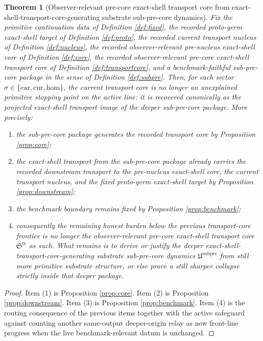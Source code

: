 \documentclass[11pt]{article}
\newcommand{\Car}{\mathrm{car}}
\newcommand{\Cur}{\mathrm{cur}}
\newcommand{\Hom}{\mathrm{hom}}
\newcommand{\PreCoreTransportCore}{\mathfrak S^{\mathrm{tr}}}
\newcommand{\SubPreCorePackage}{\mathfrak U^{\mathrm{subpre}}}
\newtheorem{theorem}{Theorem}
\begin{document}
\begin{theorem}[Observer-relevant pre-core exact-shell transport core from exact-shell-transport-core-generating substrate sub-pre-core dynamics]
\label{thm:main}
Fix the primitive continuation data of Definition \ref{def:fixed}, the recorded proto-germ exact-shell target of Definition \ref{def:proto}, the recorded current transport nucleus of Definition \ref{def:nucleus}, the recorded observer-relevant pre-nucleus exact-shell core of Definition \ref{def:core}, the recorded observer-relevant pre-core exact-shell transport core of Definition \ref{def:transportcore}, and a benchmark-faithful sub-pre-core package in the sense of Definition \ref{def:subpre}. Then, for each sector \(\sigma\in\{\Car,\Cur,\Hom\}\), the current transport core is no longer an unexplained primitive stopping point on the active line: it is recovered canonically as the projected exact-shell transport image of the deeper sub-pre-core package. More precisely:
\begin{enumerate}
    \item the sub-pre-core package generates the recorded transport core by Proposition \ref{prop:core};
    \item the exact-shell transport from the sub-pre-core package already carries the recorded downstream transport to the pre-nucleus exact-shell core, the current transport nucleus, and the fixed proto-germ exact-shell target by Proposition \ref{prop:downstream};
    \item the benchmark boundary remains fixed by Proposition \ref{prop:benchmark};
    \item consequently the remaining honest burden below the previous transport-core frontier is no longer the observer-relevant pre-core exact-shell transport core \(\PreCoreTransportCore\) as such. What remains is to derive or justify the deeper exact-shell-transport-core-generating substrate sub-pre-core dynamics \(\SubPreCorePackage\) from still more primitive substrate structure, or else prove a still sharper collapse strictly inside that deeper package.
\end{enumerate}
\end{theorem}

\begin{proof}
Item (1) is Proposition \ref{prop:core}. Item (2) is Proposition \ref{prop:downstream}. Item (3) is Proposition \ref{prop:benchmark}. Item (4) is the routing consequence of the previous items together with the active safeguard against counting another same-output deeper-origin relay as new front-line progress when the live benchmark-relevant datum is unchanged.
\end{proof}
\end{document}
